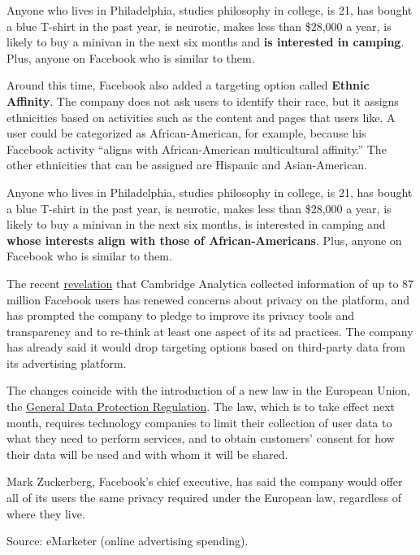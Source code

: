 Anyone who lives in Philadelphia, studies philosophy in college, is 21,
has bought a blue T-shirt in the past year, is neurotic, makes less than
\$28,000 a year, is likely to buy a minivan in the next six months and
\textbf{is interested in camping}. Plus, anyone on Facebook who is
similar to them.

Around this time, Facebook also added a targeting option called
\textbf{Ethnic Affinity}. The company does not ask users to identify
their race, but it assigns ethnicities based on activities such as the
content and pages that users like. A user could be categorized as
African-American, for example, because his Facebook activity ``aligns
with African-American multicultural affinity.'' The other ethnicities
that can be assigned are Hispanic and Asian-American.

Anyone who lives in Philadelphia, studies philosophy in college, is 21,
has bought a blue T-shirt in the past year, is neurotic, makes less than
\$28,000 a year, is likely to buy a minivan in the next six months, is
interested in camping and \textbf{whose interests align with those of
African-Americans}. Plus, anyone on Facebook who is similar to them.

The recent
\href{https://www.nytimes3xbfgragh.onion/2018/03/17/us/politics/cambridge-analytica-trump-campaign.html}{revelation}
that Cambridge Analytica collected information of up to 87 million
Facebook users has renewed concerns about privacy on the platform, and
has prompted the company to pledge to improve its privacy tools and
transparency and to re-think at least one aspect of its ad practices.
The company has already said it would drop targeting options based on
third-party data from its advertising platform.

The changes coincide with the introduction of a new law in the European
Union, the
\href{https://www.nytimes3xbfgragh.onion/2018/04/08/technology/a-tough-task-for-facebook-european-type-privacy-for-all.html}{General
Data Protection Regulation}. The law, which is to take effect next
month, requires technology companies to limit their collection of user
data to what they need to perform services, and to obtain customers'
consent for how their data will be used and with whom it will be shared.

Mark Zuckerberg, Facebook's chief executive, has said the company would
offer all of its users the same privacy required under the European law,
regardless of where they live.

Source: eMarketer (online advertising spending).

